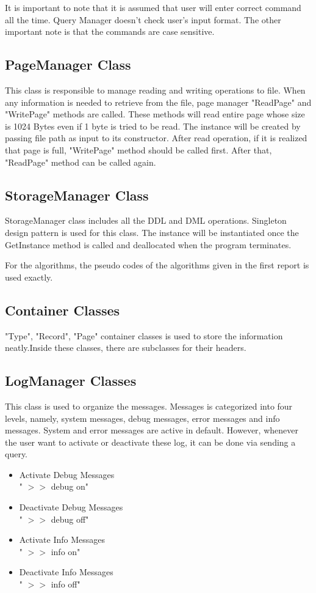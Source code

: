 \documentclass[12pt]{article}
\begin{document}
It is important to note that it is assumed that user will enter correct command all the time. Query Manager doesn't check user's input format. The other important note is that the commands are case sensitive. 

\subsection{PageManager Class}
This class is responsible to manage reading and writing operations to file. When any information is needed to retrieve from the file, page manager "ReadPage" and "WritePage" methods are called. These methods will read entire page whose size is 1024 Bytes even if 1 byte is tried to be read. The instance will be created by passing file path as input to its constructor. After read operation, if it is realized that page is full, "WritePage" method should be called first. After that, "ReadPage" method can be called again.

\subsection{StorageManager Class}
StorageManager class includes all the DDL and DML operations. Singleton design pattern is used for this class. The instance will be instantiated once the GetInstance method is called and deallocated when the program terminates. 

For the algorithms, the pseudo codes of the algorithms given in the first report is used exactly. 

\subsection{Container Classes}

"Type", "Record", "Page" container classes is used to store the information neatly.Inside these classes, there are subclasses for their headers. 

\subsection{LogManager Classes}
This class is used to organize the messages. Messages is categorized into four levels, namely, system messages, debug messages, error messages and info messages. System and error messages are active in default. However, whenever the user want to activate or deactivate these log, it can be done via sending a query. 

\begin{itemize}
\item Activate Debug Messages \\
" $>>$ debug on"
\item Deactivate Debug Messages \\
" $>>$ debug off"
\item Activate Info Messages \\
" $>>$ info on"
\item Deactivate Info Messages \\
" $>>$ info off"
\end{itemize}
\end{document}
